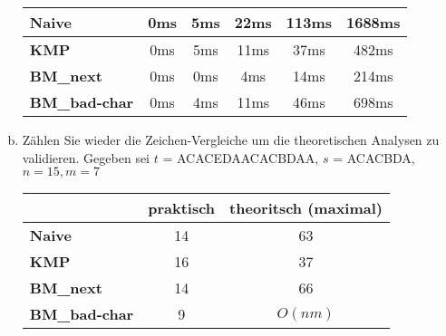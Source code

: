 \documentclass{article}
\begin{document}
\begin{flushleft}
\begin{enumerate}[(a)]
\begin{tabular}{||l|c|c|c|c|c||}
        \hline \textbf{Naive} & 0ms & 5ms & 22ms & 113ms & 1688ms \\
        \hline \textbf{KMP} & 0ms & 5ms & 11ms & 37ms & 482ms \\
        \hline \textbf{BM\_next} & 0ms & 0ms & 4ms & 14ms & 214ms \\
        \hline \textbf{BM\_bad-char} & 0ms & 4ms & 11ms & 46ms & 698ms \\
        \hline
        \end{tabular}
    \newline
    \item Zählen Sie wieder die Zeichen-Vergleiche um die theoretischen Analysen zu validieren.
    \newline
    Gegeben sei $t$ = ACACEDAACACBDAA, $s$ = ACACBDA, $n = 15, m = 7$
    \newline \\
    \begin{tabular}{||l|c|c||}
        \hline & praktisch & theoritsch (maximal) \\
        \hline \textbf{Naive} & 14 & 63 \\
        \hline \textbf{KMP} & 16 & 37 \\
        \hline \textbf{BM\_next} & 14 & 66 \\
        \hline \textbf{BM\_bad-char} & 9 & $O(nm)$ \\
        \hline
        \end{tabular}
    \newline
\end{enumerate}
\end{flushleft}
\end{document}
